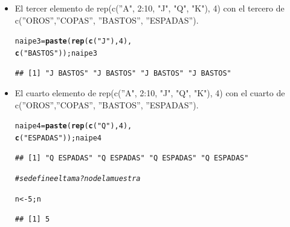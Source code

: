 \documentclass[12pt,letterpaper]{article}\usepackage[]{graphicx}\usepackage[]{color}
\makeatletter
\newcommand{\hlnum}[1]{\textcolor[rgb]{0.686,0.059,0.569}{#1}}%
\newcommand{\hlstr}[1]{\textcolor[rgb]{0.192,0.494,0.8}{#1}}%
\newcommand{\hlcom}[1]{\textcolor[rgb]{0.678,0.584,0.686}{\textit{#1}}}%
\newcommand{\hlstd}[1]{\textcolor[rgb]{0.345,0.345,0.345}{#1}}%
\newcommand{\hlkwb}[1]{\textcolor[rgb]{0.69,0.353,0.396}{#1}}%
\newcommand{\hlkwd}[1]{\textcolor[rgb]{0.737,0.353,0.396}{\textbf{#1}}}%
\newenvironment{kframe}{%
 \def\at@end@of@kframe{}%
 \ifinner\ifhmode%
  \def\at@end@of@kframe{\end{minipage}}%
  \begin{minipage}{\columnwidth}%
 \fi\fi%
 \def\FrameCommand##1{\hskip\@totalleftmargin \hskip-\fboxsep
 \colorbox{shadecolor}{##1}\hskip-\fboxsep
     \hskip-\linewidth \hskip-\@totalleftmargin \hskip\columnwidth}%
 \MakeFramed {\advance\hsize-\width
   \@totalleftmargin\z@ \linewidth\hsize
   \@setminipage}}%
 {\par\unskip\endMakeFramed%
 \at@end@of@kframe}
\newenvironment{knitrout}{}{} %
\makeatother
\begin{document}
\begin{enumerate}
\begin{itemize}
\item El tercer elemento de rep(c(''A", 2:10, "J", "Q", "K"), 4) con el tercero de c(''OROS'',''COPAS'', ''BASTOS'', ''ESPADAS''). 

\begin{knitrout}
\color{fgcolor}\begin{kframe}
\begin{alltt}
\hlstd{naipe3} \hlkwb{=} \hlkwd{paste}\hlstd{(}\hlkwd{rep}\hlstd{(}\hlkwd{c}\hlstd{(}\hlstr{"J"}\hlstd{),}\hlnum{4}\hlstd{),}
              \hlkwd{c}\hlstd{(}\hlstr{"BASTOS"}\hlstd{));naipe3}
\end{alltt}
\begin{verbatim}
## [1] "J BASTOS" "J BASTOS" "J BASTOS" "J BASTOS"
\end{verbatim}
\end{kframe}
\end{knitrout}

\item El cuarto elemento de rep(c(''A", 2:10, "J", "Q", "K"), 4) con el cuarto de c(''OROS'',''COPAS'', ''BASTOS'', ''ESPADAS'').

\begin{knitrout}
\color{fgcolor}\begin{kframe}
\begin{alltt}
\hlstd{naipe4} \hlkwb{=} \hlkwd{paste}\hlstd{(}\hlkwd{rep}\hlstd{(}\hlkwd{c}\hlstd{(}\hlstr{"Q"}\hlstd{),} \hlnum{4}\hlstd{),}
              \hlkwd{c}\hlstd{(}\hlstr{"ESPADAS"}\hlstd{));naipe4}
\end{alltt}
\begin{verbatim}
## [1] "Q ESPADAS" "Q ESPADAS" "Q ESPADAS" "Q ESPADAS"
\end{verbatim}
\end{kframe}
\end{knitrout}

\begin{knitrout}
\color{fgcolor}\begin{kframe}
\begin{alltt}
\hlcom{# se define el tama?no de la muestra }

\hlstd{n} \hlkwb{<-} \hlnum{5}\hlstd{; n}
\end{alltt}
\begin{verbatim}
## [1] 5
\end{verbatim}
\end{kframe}
\end{knitrout}


\end{itemize}
\end{enumerate}
\end{document}
